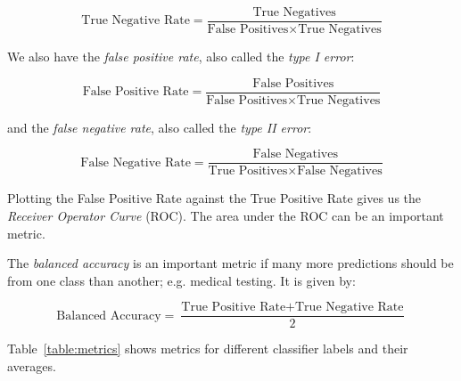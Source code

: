 \documentclass{article}
\begin{document}
\begin{multicols}{2}
$$ \mbox{True Negative Rate} = \frac{\mbox{True Negatives}}{\mbox{False Positives} \times \mbox{True Negatives}} $$

We also have the \textit{false positive rate}, also called the \textit{type I error}:

$$ \mbox{False Positive Rate} = \frac{\mbox{False Positives}}{\mbox{False Positives} \times \mbox{True Negatives}} $$

and the \textit{false negative rate}, also called the \textit{type II error}:

$$ \mbox{False Negative Rate} = \frac{\mbox{False Negatives}}{\mbox{True Positives} \times \mbox{False Negatives}} $$

Plotting the False Positive Rate against the True Positive Rate gives us the \textit{Receiver Operator Curve} (ROC). The area under the ROC can be an important metric.

The \textit{balanced accuracy} is an important metric if many more predictions should be from one class than another; e.g. medical testing. It is given by:

$$ \mbox{Balanced Accuracy} = \frac{\mbox{True Positive Rate} + \mbox{True Negative Rate}}{2} $$

Table~\ref{table:metrics} shows metrics for different classifier labels and their averages.


\end{multicols}
\end{document}
